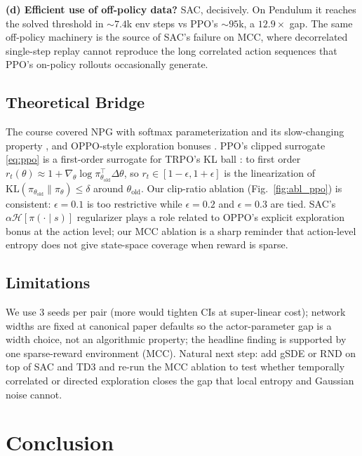 \documentclass{article}
\begin{document}
\textbf{(d) Efficient use of off-policy data?} SAC, decisively. On Pendulum it reaches the solved threshold in $\sim 7.4$k env steps vs PPO's $\sim 95$k, a $12.9\times$ gap. The same off-policy machinery is the source of SAC's failure on MCC, where decorrelated single-step replay cannot reproduce the long correlated action sequences that PPO's on-policy rollouts occasionally generate.

\subsection{Theoretical Bridge}
\label{sec:theory}

The course covered NPG with softmax parameterization and its slow-changing property \cite{agarwal2020theory, mei2020softmax}, and OPPO-style exploration bonuses \cite{cai2020provably}. PPO's clipped surrogate \eqref{eq:ppo} is a first-order surrogate for TRPO's KL ball \cite{schulman2015trust}: to first order $r_t(\theta) \approx 1 + \nabla_\theta \log \pi_{\theta_{\text{old}}}^{\top} \Delta\theta$, so $r_t \in [1-\epsilon, 1+\epsilon]$ is the linearization of $\mathrm{KL}(\pi_{\theta_{\text{old}}} \| \pi_\theta) \leq \delta$ around $\theta_{\text{old}}$. Our clip-ratio ablation (Fig.~\ref{fig:abl_ppo}) is consistent: $\epsilon{=}0.1$ is too restrictive while $\epsilon{=}0.2$ and $\epsilon{=}0.3$ are tied. SAC's $\alpha \mathcal{H}[\pi(\cdot \mid s)]$ regularizer plays a role related to OPPO's explicit exploration bonus at the action level; our MCC ablation is a sharp reminder that action-level entropy does not give state-space coverage when reward is sparse.

\subsection{Limitations}
\label{sec:limitations}

We use 3 seeds per pair (more would tighten CIs at super-linear cost); network widths are fixed at canonical paper defaults so the actor-parameter gap is a width choice, not an algorithmic property; the headline finding is supported by one sparse-reward environment (MCC). Natural next step: add gSDE \cite{raffin2022smooth} or RND on top of SAC and TD3 and re-run the MCC ablation to test whether temporally correlated or directed exploration closes the gap that local entropy and Gaussian noise cannot.


\section{Conclusion}
\label{sec:conclusion}
\end{document}
